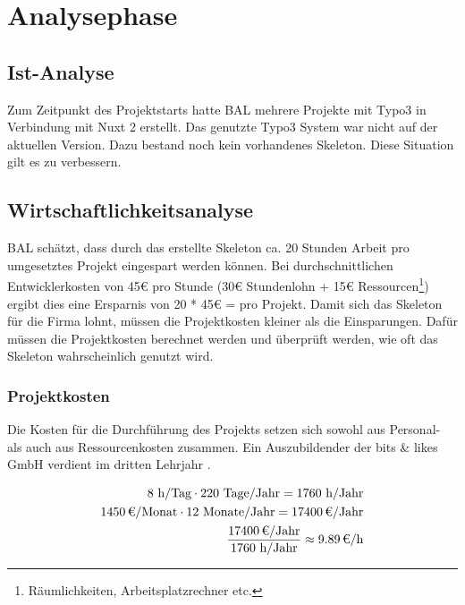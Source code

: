 \section{Analysephase} 
\label{sec:Analysephase}


\subsection{Ist-Analyse} 
\label{sec:IstAnalyse}

Zum Zeitpunkt des Projektstarts hatte \acs{BAL} mehrere Projekte mit Typo3 in Verbindung mit Nuxt 2 erstellt. Das genutzte Typo3 System war nicht auf der aktuellen Version. Dazu bestand noch kein vorhandenes Skeleton. Diese Situation gilt es zu verbessern.


\subsection{Wirtschaftlichkeitsanalyse}
\label{sec:Wirtschaftlichkeitsanalyse}

\acs{BAL} schätzt, dass durch das erstellte Skeleton ca. 20 Stunden Arbeit pro umgesetztes Projekt eingespart werden können. Bei durchschnittlichen Entwicklerkosten von 45€ pro Stunde (30€ Stundenlohn + 15€ Ressourcen\footnote{Räumlichkeiten, Arbeitsplatzrechner etc.}) ergibt dies eine Ersparnis von 20 * 45€ =  pro Projekt. Damit sich das Skeleton für die Firma lohnt, müssen die Projektkosten kleiner als die Einsparungen. Dafür müssen die Projektkosten berechnet werden und überprüft werden, wie oft das Skeleton wahrscheinlich genutzt wird.


\subsubsection{Projektkosten}
\label{sec:Projektkosten}

Die Kosten für die Durchführung des Projekts setzen sich sowohl aus Personal- als auch aus Ressourcenkosten zusammen.
Ein Auszubildender der bits \& likes GmbH verdient im dritten Lehrjahr .

\begin{eqnarray}
8 \mbox{ h/Tag} \cdot 220 \mbox{ Tage/Jahr} = 1760 \mbox{ h/Jahr}\\
\eur{1450}\mbox{/Monat} \cdot 12 \mbox{ Monate/Jahr} = \eur{17400} \mbox{/Jahr}\\
\frac{\eur{17400} \mbox{/Jahr}}{1760 \mbox{ h/Jahr}} \approx \eur{9.89}\mbox{/h}
\end{eqnarray}

